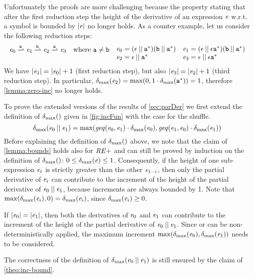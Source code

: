 Unfortunately the proofs are more challenging because the property stating that after the first reduction step the height of the derivative of an expression $\mathit {e}$ w.r.t. a symbol is bounded by ${\mid}{\mathit {e}}{\mid}$ no longer holds.
As a counter example, let us consider the following reduction steps:
\[
 \begin{array}{ll}
  \re_0\parDer{\sym}\re_1\parDer{\asym}\re_2\parDer{\sym}\re_3 & \mbox{where }\sym\neq\asym
 \end{array}
 \begin{array}[t]{ll}
  \re_0=(\eps\shuffleop\starop{\sym})\catop(\asym\shuffleop\starop{\sym}) &
  \re_1=(\eps\shuffleop\eps\catop\starop{\sym})\catop(\asym\shuffleop\starop{\sym})                                     \\
  \re_2=\eps\shuffleop\starop{\sym}                                       & \re_3=\eps\shuffleop\eps\catop\starop{\sym}
 \end{array}
\]
We have ${\mid}{\mathit {e}_1}{\mid}={\mid}{\mathit {e}_0}{\mid}+1$ (first reduction step), but also ${\mid}{\mathit {e}_3}{\mid}={\mid}{\mathit {e}_2}{\mid}+1$ (third reduction step). In particular, ${\delta_{\max}}({\mathit {e}_2})=
 \max(0,1\cdot{\delta_{\max}}({{\mathtt {a}}^*}))=1$, therefore \cref{lemma:zero-inc} no longer holds.

To prove the extended versions of the results of \cref{sec:parDer} we first extend the definition of ${\delta_{\max}}({})$ given in \cref{fig:incFun} with the case for the shuffle.
\[
 {\delta_{\max}}({\mathit {e}_0\mathbin{||}\mathit {e}_1})=\max(\mathit{geq}({\mathit {e}_0},{\mathit {e}_1})\cdot{\delta_{\max}}({\mathit {e}_0}),\mathit{geq}({\mathit {e}_1},{\mathit {e}_0})\cdot{\delta_{\max}}({\mathit {e}_1}))
\]
Before explaining the definition of ${\delta_{\max}}({})$ above, we note that the claim of \cref{lemma:bounds} holds also for $\mathit {RE+}$ and can still be proved by induction on the definition of ${\delta_{\max}}({})$: $0\leq{\delta_{\max}}({\mathit {e}})\leq 1$.
Consequently, if the height of one sub-expression $\mathit {e}_i$ is strictly greater than the other $\mathit {e}_{1-i}$, then only the partial derivative of $\mathit {e}_i$ can contribute to the increment of the height of the partial derivative of $\mathit {e}_0\mathbin{||}\mathit {e}_1$, because increments are always bounded by 1.
Note that $\max({\delta_{\max}}({\mathit {e}_i}),0)={\delta_{\max}}({\mathit {e}_i})$, since ${\delta_{\max}}({\mathit {e}_i})\geq 0$.

If ${\mid}{\mathit {e}_0}{\mid}={\mid}{\mathit {e}_1}{\mid}$, then both the derivatives of $\mathit {e}_0$ and $\mathit {e}_1$ can contribute to the increment of the height of the partial derivative of $\mathit {e}_0\mathbin{||}\mathit {e}_1$.
Since  or  can be non-deterministically applied, the maximum increment
$\max({\delta_{\max}}({\mathit {e}_0}),{\delta_{\max}}({\mathit {e}_1}))$ needs to be considered.

The correctness of the definition of ${\delta_{\max}}({\mathit {e}_0\mathbin{||}\mathit {e}_1})$ is still ensured by the claim of \cref{theo:inc-bound}.

